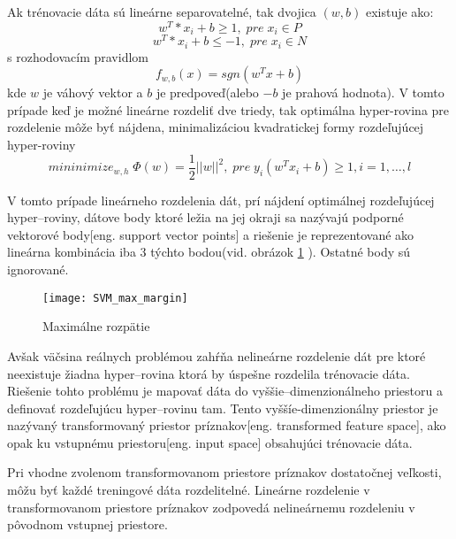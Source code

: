 Ak trénovacie dáta sú lineárne separovatelné, tak dvojica $(w, b)$ existuje ako\cite{prop:SupervisedMachineLearning}:
\begin{equation}
    \label{eq:SVMPair1}
    w^T * x_i + b \geq 1, \; pre \; x_i \in P
\end{equation}
\begin{equation}
    \label{eq:SVMPair2}
    w^T * x_i + b \leq -1, \; pre \; x_i \in N
\end{equation}
s rozhodovacím pravidlom
\begin{equation}
    \label{eq:SVMDecisionRule}
    f_{w,b}(x) = sgn(w^T x + b)
\end{equation}
kde $w$ je váhový vektor a $b$ je predpoveď(alebo $-b$ je prahová hodnota).
V tomto prípade keď je možné lineárne rozdeliť dve triedy, tak optimálna hyper-rovina pre rozdelenie
    môže byť nájdena, minimalizáciou kvadratickej formy rozdeľujúcej hyper-roviny
\begin{equation}
    \label{eq:SVMDecisionRule}
    mininimize_{w,h} \; \Phi(w) = \frac{1}{2}||w||^2, \; pre \; y_i(w^Tx_i + b) \geq 1, i = 1, \dots, l
\end{equation}

V tomto prípade lineárneho rozdelenia dát, prí nájdení optimálnej rozdeľujúcej hyper--roviny, dátove body ktoré ležia na jej okraji
    sa nazývajú podporné vektorové body[eng. support vector points] a riešenie je reprezentované ako lineárna kombinácia iba 3 týchto bodou(vid. obrázok \ref{pic:SVMMAxMargin} ).
Ostatné body sú ignorované\cite{prop:SupervisedMachineLearning}.

\begin{figure}[H]
	\centering
	\texttt{[image: SVM\_max\_margin]}
	\caption{Maximálne rozpätie\cite{prop:SupervisedMachineLearning}}
	\label{pic:SVMMAxMargin}
\end{figure}

Avšak väčsina reálnych problémou zahŕňa nelineárne rozdelenie dát pre ktoré neexistuje žiadna hyper--rovina ktorá by úspešne rozdelila trénovacie dáta.
Riešenie tohto problému je mapovať dáta do vyššie--dimenzionálneho priestoru a definovať rozdeľujúcu hyper--rovinu tam.
Tento vyššíe-dimenzionálny priestor je nazývaný transformovaný priestor príznakov[eng. transformed feature space], ako opak ku vstupnému priestoru[eng. input space] obsahujúci trénovacie dáta\cite{prop:SupervisedMachineLearning}.

Pri vhodne zvolenom transformovanom priestore príznakov dostatočnej veľkosti, môžu byť každé treningové dáta rozdelitelné.
Lineárne rozdelenie v transformovanom priestore príznakov zodpovedá nelineárnemu rozdeleniu v pôvodnom vstupnej priestore.

